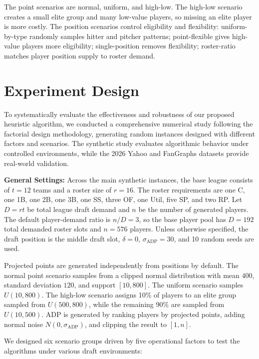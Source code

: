 \documentclass[12pt]{article}
\begin{document}
The point scenarios are normal, uniform, and high-low. The high-low scenario creates a small elite group and many low-value players, so missing an elite player is more costly. The position scenarios control eligibility and flexibility: uniform-by-type randomly samples hitter and pitcher patterns; point-flexible gives high-value players more eligibility; single-position removes flexibility; roster-ratio matches player position supply to roster demand.

\section{Experiment Design}
To systematically evaluate the effectiveness and robustness of our proposed heuristic algorithm, we conducted a comprehensive numerical study following the factorial design methodology, generating random instances designed with different factors and scenarios. The synthetic study evaluates algorithmic behavior under controlled environments, while the 2026 Yahoo and FanGraphs datasets provide real-world validation.

\textbf{General Settings:}
Across the main synthetic instances, the base league consists of \(t=12\) teams and a roster size of \(r=16\). The roster requirements are one C, one 1B, one 2B, one 3B, one SS, three OF, one Util, five SP, and two RP. Let \(D=rt\) be total league draft demand and \(n\) be the number of generated players. The default player-demand ratio is \(n/D=3\), so the base player pool has \(D=192\) total demanded roster slots and \(n=576\) players. Unless otherwise specified, the draft position is the middle draft slot, \(\delta=0\), \(\sigma_{\text{ADP}}=30\), and 10 random seeds are used.

Projected points are generated independently from positions by default. The normal point scenario samples from a clipped normal distribution with mean \(400\), standard deviation \(120\), and support \([10,800]\). The uniform scenario samples \(U(10,800)\). The high-low scenario assigns 10\% of players to an elite group sampled from \(U(500,800)\), while the remaining 90\% are sampled from \(U(10,500)\). ADP is generated by ranking players by projected points, adding normal noise \(N(0,\sigma_{\text{ADP}})\), and clipping the result to \([1,n]\).

\vspace{0.1cm}
We designed six scenario groups driven by five operational factors to test the algorithms under various draft environments:
\end{document}
